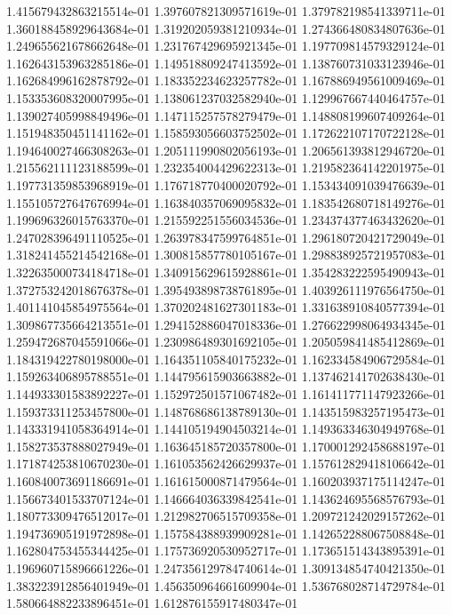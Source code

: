 1.415679432863215514e-01
1.397607821309571619e-01
1.379782198541339711e-01
1.360188458929643684e-01
1.319202059381210934e-01
1.274366480834807636e-01
1.249655621678662648e-01
1.231767429695921345e-01
1.197709814579329124e-01
1.162643153963285186e-01
1.149518809247413592e-01
1.138760731033123946e-01
1.162684996162878792e-01
1.183352234623257782e-01
1.167886949561009469e-01
1.153353608320007995e-01
1.138061237032582940e-01
1.129967667440464757e-01
1.139027405998849496e-01
1.147115257578279479e-01
1.148808199607409264e-01
1.151948350451141162e-01
1.158593056603752502e-01
1.172622107170722128e-01
1.194640027466308263e-01
1.205111990802056193e-01
1.206561393812946720e-01
1.215562111123188599e-01
1.232354004429622313e-01
1.219582364142201975e-01
1.197731359853968919e-01
1.176718770400020792e-01
1.153434091039476639e-01
1.155105727647676994e-01
1.163840357069095832e-01
1.183542680718149276e-01
1.199696326015763370e-01
1.215592251556034536e-01
1.234374377463432620e-01
1.247028396491110525e-01
1.263978347599764851e-01
1.296180720421729049e-01
1.318241455214542168e-01
1.300815857780105167e-01
1.298838925721957083e-01
1.322635000734184718e-01
1.340915629615928861e-01
1.354283222595490943e-01
1.372753242018676378e-01
1.395493898738761895e-01
1.403926111976564750e-01
1.401141045854975564e-01
1.370202481627301183e-01
1.331638910840577394e-01
1.309867735664213551e-01
1.294152886047018336e-01
1.276622998064934345e-01
1.259472687045591066e-01
1.230986489301692105e-01
1.205059841485412869e-01
1.184319422780198000e-01
1.164351105840175232e-01
1.162334584906729584e-01
1.159263406895788551e-01
1.144795615903663882e-01
1.137462141702638430e-01
1.144933301583892227e-01
1.152972501571067482e-01
1.161411771147923266e-01
1.159373311253457800e-01
1.148768686138789130e-01
1.143515983257195473e-01
1.143331941058364914e-01
1.144105194904503214e-01
1.149363346304949768e-01
1.158273537888027949e-01
1.163645185720357800e-01
1.170001292458688197e-01
1.171874253810670230e-01
1.161053562426629937e-01
1.157612829418106642e-01
1.160840073691186691e-01
1.161615000871479564e-01
1.160203937175114247e-01
1.156673401533707124e-01
1.146664036339842541e-01
1.143624695568576793e-01
1.180773309476512017e-01
1.212982706515709358e-01
1.209721242029157262e-01
1.194736905191972898e-01
1.157584388939909281e-01
1.142652288067508848e-01
1.162804753455344425e-01
1.175736920530952717e-01
1.173651514343895391e-01
1.196960715896661226e-01
1.247356129784740614e-01
1.309134854740421350e-01
1.383223912856401949e-01
1.456350964661609904e-01
1.536768028714729784e-01
1.580664882233896451e-01
1.612876155917480347e-01
